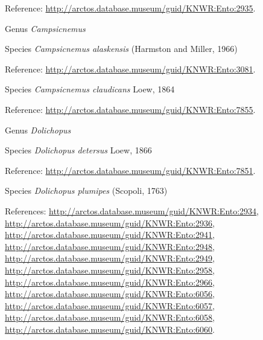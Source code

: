 \documentclass[9pt, article]{memoir}
\begin{document}
\begin{multicols}{2}
\vspace{6pt}Reference: 
\url{http://arctos.database.museum/guid/KNWR:Ento:2935}.

\vspace{6pt}\noindent\hspace{30pt}Genus \textit{Campsicnemus}


\vspace{6pt}\noindent\hspace{36pt}Species \textit{Campsicnemus alaskensis} (Harmston and Miller, 1966)


\vspace{6pt}Reference: 
\url{http://arctos.database.museum/guid/KNWR:Ento:3081}.

\vspace{6pt}\noindent\hspace{36pt}Species \textit{Campsicnemus claudicans} Loew, 1864


\vspace{6pt}Reference: 
\url{http://arctos.database.museum/guid/KNWR:Ento:7855}.

\vspace{6pt}\noindent\hspace{30pt}Genus \textit{Dolichopus}


\vspace{6pt}\noindent\hspace{36pt}Species \textit{Dolichopus detersus} Loew, 1866


\vspace{6pt}Reference: 
\url{http://arctos.database.museum/guid/KNWR:Ento:7851}.

\vspace{6pt}\noindent\hspace{36pt}Species \textit{Dolichopus plumipes} (Scopoli, 1763)


\vspace{6pt}References: 
\url{http://arctos.database.museum/guid/KNWR:Ento:2934}, 
\url{http://arctos.database.museum/guid/KNWR:Ento:2936}, 
\url{http://arctos.database.museum/guid/KNWR:Ento:2941}, 
\url{http://arctos.database.museum/guid/KNWR:Ento:2948}, 
\url{http://arctos.database.museum/guid/KNWR:Ento:2949}, 
\url{http://arctos.database.museum/guid/KNWR:Ento:2958}, 
\url{http://arctos.database.museum/guid/KNWR:Ento:2966}, 
\url{http://arctos.database.museum/guid/KNWR:Ento:6056}, 
\url{http://arctos.database.museum/guid/KNWR:Ento:6057}, 
\url{http://arctos.database.museum/guid/KNWR:Ento:6058}, 
\url{http://arctos.database.museum/guid/KNWR:Ento:6060}.


\end{multicols}
\end{document}
